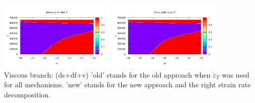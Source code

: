 \begin{itemize}
\begin{center}
\includegraphics[width=5.5cm]{images/rheology/example/map_isplast_old-1}
\includegraphics[width=5.5cm]{images/rheology/example/map_isplast_new-1}\\
{\captionfont Viscous branch: (ds+df+v) 'old' stands 
for the old approach when $\dot{\varepsilon}_T$
was used for all mechanisms. 'new' stands for the new approach and the right strain rate 
decomposition.}
\end{center}




\end{itemize}
